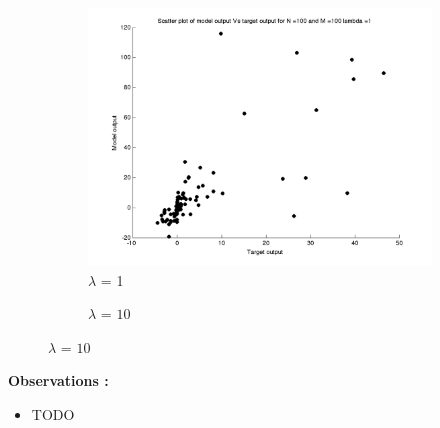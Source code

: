 \documentclass{article}
\begin{document}
\begin{figure}[H]
\begin{subfigure}{.5\textwidth}
\centering
\includegraphics[width=\linewidth]{D2/Scatter/Varyinglambda_N100M100lambda1}
\caption{$\lambda$ = 1}
\end{subfigure}
\begin{subfigure}{.5\textwidth}
\caption{$\lambda$ = $10$}
\end{subfigure}



\end{figure}


\textbf{Observations :}

\begin{itemize}
\item TODO
\end{itemize}
\end{document}
